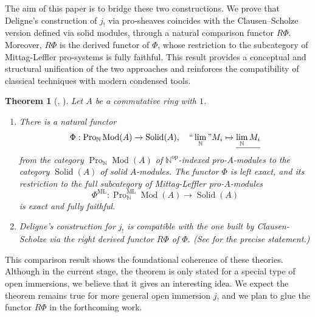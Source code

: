 \documentclass[11pt]{amsart}
\newcommand{\ra}{\rightarrow} %
\newcommand{\N}{\mathbb{N}}
\newcommand{\Mod}{\operatorname{Mod}}
\newcommand{\ML}{\operatorname{ML}}
\newcommand{\op}{{\operatorname{op}}}
\renewcommand{\lim}{\operatornamewithlimits{\rm{lim}}}
\newcommand{\Solid}{\operatorname{Solid}}
\newcommand{\ul}{\underline}
\newcommand{\Pro}{\operatorname{Pro}}
\theoremstyle{plain}
\newtheorem{thm}[prop]{Theorem}
\theoremstyle{definition}
\numberwithin{equation}{prop}
\begin{document}
The aim of this paper is to bridge these two constructions. 
We prove that Deligne’s construction of 
$j_!$ via pro-sheaves coincides with the Clausen–Scholze version defined via solid modules, through a natural comparison functor $R\Phi$. 
Moreover, $R\Phi$ is the derived functor of $\Phi$, whose restriction to
the subcategory of Mittag-Leffler pro-systems is fully faithful. This result provides a conceptual and structural unification of the two approaches and reinforces the compatibility of classical techniques with modern condensed tools.
\begin{thm}[{, }]
Let $A$ be a commutative ring with $1$.
\begin{enumerate} 
\item 
There is a natural functor 
$$\Phi:\Pro_{\N}\Mod(A)\ra \Solid(A), \quad ``\lim_\N" M_i\mapsto \ul{\lim_\N M_i}$$
from the category $\Pro_{\N}\Mod(A)$ of $\N^\op$-indexed pro-$A$-modules to the category $\Solid(A)$ of solid $A$-modules.
The functor $\Phi$ is  left exact, and its restriction to the full subcategory of Mittag-Leffler pro-$A$-modules
$$\Phi^{\ML}:\Pro_{\N}^{\ML}\Mod(A)\ra \Solid(A)$$
is exact and fully faithful.
\item 
Deligne's construction for $j_!$ is compatible with the one built by Clausen-Scholze via the right derived functor $R\Phi$ of $\Phi$. (See  for the precise statement.)
\end{enumerate}
\end{thm}
This comparison result shows the foundational coherence of these theories. 
Although in the current stage, the theorem is only stated for 
a special type of open immersions, we believe that it gives an interesting idea.
We expect the theorem remains true for more general open immersion $j$, and we plan to glue the functor $R\Phi$ in the forthcoming work.
\end{document}
